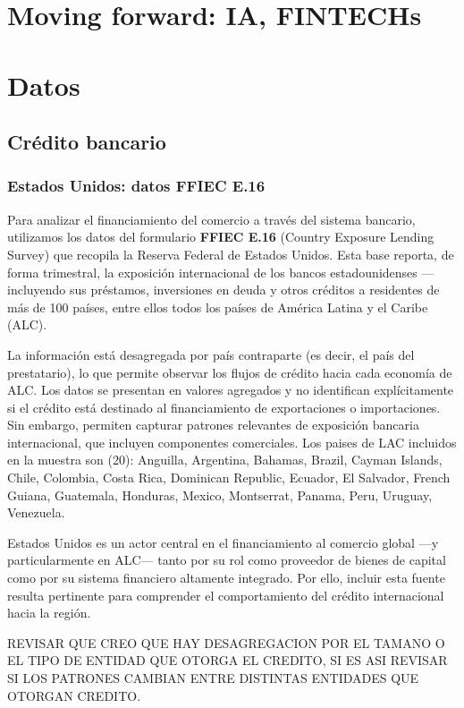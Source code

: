 \documentclass[11pt]{article}
\begin{document}
\section{Moving forward: IA, FINTECHs}

\section{Datos}
\subsection{Crédito bancario}

\subsubsection{Estados Unidos: datos FFIEC E.16}

Para analizar el financiamiento del comercio a través del sistema bancario, utilizamos los datos del formulario \textbf{FFIEC E.16} (Country Exposure Lending Survey) que recopila la Reserva Federal de Estados Unidos. Esta base reporta, de forma trimestral, la exposición internacional de los bancos estadounidenses —incluyendo sus préstamos, inversiones en deuda y otros créditos a residentes de más de 100 países, entre ellos todos los países de América Latina y el Caribe (ALC).

La información está desagregada por país contraparte (es decir, el país del prestatario), lo que permite observar los flujos de crédito hacia cada economía de ALC. Los datos se presentan en valores agregados y no identifican explícitamente si el crédito está destinado al financiamiento de exportaciones o importaciones. Sin embargo, permiten capturar patrones relevantes de exposición bancaria internacional, que incluyen componentes comerciales. Los paises de LAC incluidos en la muestra son (20): Anguilla, Argentina, Bahamas, Brazil, Cayman Islands, Chile, Colombia, Costa Rica, Dominican Republic, Ecuador, El Salvador, French Guiana, Guatemala, Honduras, Mexico, Montserrat, Panama, Peru, Uruguay, Venezuela.

Estados Unidos es un actor central en el financiamiento al comercio global —y particularmente en ALC— tanto por su rol como proveedor de bienes de capital como por su sistema financiero altamente integrado. Por ello, incluir esta fuente resulta pertinente para comprender el comportamiento del crédito internacional hacia la región.

REVISAR QUE CREO QUE HAY DESAGREGACION POR EL TAMANO O EL TIPO DE ENTIDAD QUE OTORGA EL CREDITO, SI ES ASI REVISAR SI LOS PATRONES CAMBIAN ENTRE DISTINTAS ENTIDADES QUE OTORGAN CREDITO.
\end{document}
